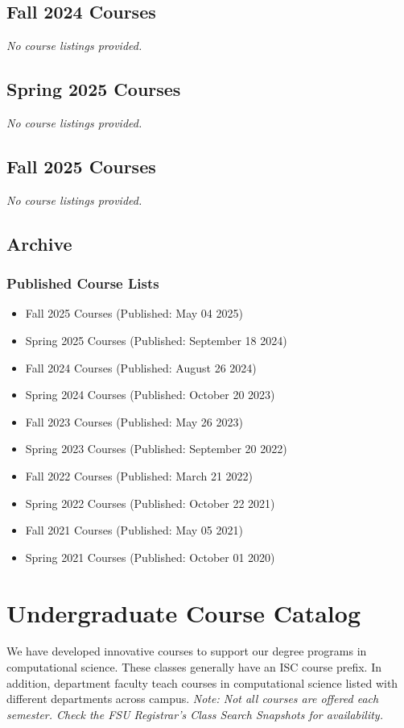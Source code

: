 \documentclass[12pt,a4paper]{article}
\begin{document}
\subsection{Fall 2024 Courses}
\textit{No course listings provided.}

\subsection{Spring 2025 Courses}
\textit{No course listings provided.}

\subsection{Fall 2025 Courses}
\textit{No course listings provided.}

\subsection{Archive}
\subsubsection*{Published Course Lists}
\begin{itemize}
    \item Fall 2025 Courses (Published: May 04 2025)
    \item Spring 2025 Courses (Published: September 18 2024)
    \item Fall 2024 Courses (Published: August 26 2024)
    \item Spring 2024 Courses (Published: October 20 2023)
    \item Fall 2023 Courses (Published: May 26 2023)
    \item Spring 2023 Courses (Published: September 20 2022)
    \item Fall 2022 Courses (Published: March 21 2022)
    \item Spring 2022 Courses (Published: October 22 2021)
    \item Fall 2021 Courses (Published: May 05 2021)
    \item Spring 2021 Courses (Published: October 01 2020)
\end{itemize}
\newpage

\section{Undergraduate Course Catalog}
We have developed innovative courses to support our degree programs in computational science. These classes generally have an ISC course prefix. In addition, department faculty teach courses in computational science listed with different departments across campus.
\textit{Note: Not all courses are offered each semester. Check the FSU Registrar's Class Search Snapshots for availability.}
\end{document}
